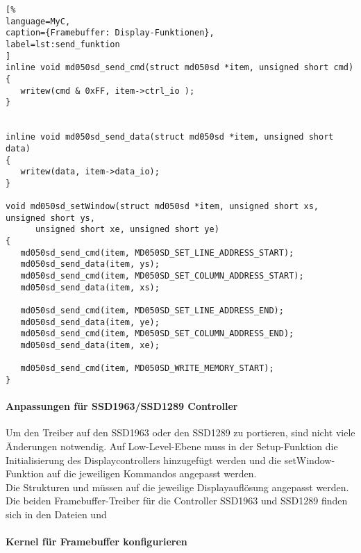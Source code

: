 \begin{lstlisting}[%
language=MyC,
caption={Framebuffer: Display-Funktionen},
label=lst:send_funktion
]
inline void md050sd_send_cmd(struct md050sd *item, unsigned short cmd)
{
   writew(cmd & 0xFF, item->ctrl_io );
}


inline void md050sd_send_data(struct md050sd *item, unsigned short data)
{
   writew(data, item->data_io);
}

void md050sd_setWindow(struct md050sd *item, unsigned short xs, unsigned short ys,
      unsigned short xe, unsigned short ye)
{
   md050sd_send_cmd(item, MD050SD_SET_LINE_ADDRESS_START);
   md050sd_send_data(item, ys);
   md050sd_send_cmd(item, MD050SD_SET_COLUMN_ADDRESS_START);
   md050sd_send_data(item, xs);

   md050sd_send_cmd(item, MD050SD_SET_LINE_ADDRESS_END);
   md050sd_send_data(item, ye);
   md050sd_send_cmd(item, MD050SD_SET_COLUMN_ADDRESS_END);
   md050sd_send_data(item, xe);

   md050sd_send_cmd(item, MD050SD_WRITE_MEMORY_START);
}
\end{lstlisting}
\newpage
\paragraph{Anpassungen für SSD1963/SSD1289 Controller}
Um den Treiber auf den SSD1963 oder den SSD1289 zu portieren, sind nicht viele Änderungen notwendig. Auf Low-Level-Ebene muss in der Setup-Funktion die Initialisierung des Displaycontrollers hinzugefügt werden und die setWindow-Funktion auf die jeweiligen Kommandos angepasst werden. \\
Die Strukturen  und  müssen auf die jeweilige Displayauflösung angepasst werden. Die beiden Framebuffer-Treiber für die Controller SSD1963 und SSD1289 finden sich in den Dateien  und 
\paragraph{Kernel für Framebuffer konfigurieren}

\newpage
